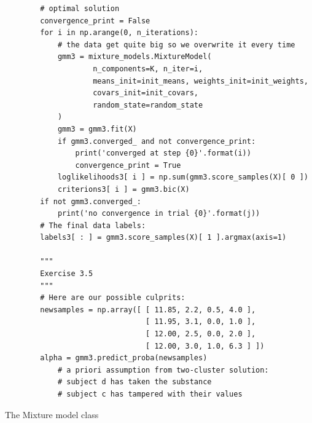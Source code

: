 \begin{verbatim}
        # optimal solution
        convergence_print = False
        for i in np.arange(0, n_iterations):
            # the data get quite big so we overwrite it every time
            gmm3 = mixture_models.MixtureModel(
                    n_components=K, n_iter=i,
                    means_init=init_means, weights_init=init_weights,
                    covars_init=init_covars,
                    random_state=random_state
            )
            gmm3 = gmm3.fit(X)
            if gmm3.converged_ and not convergence_print:
                print('converged at step {0}'.format(i))
                convergence_print = True
            loglikelihoods3[ i ] = np.sum(gmm3.score_samples(X)[ 0 ])
            criterions3[ i ] = gmm3.bic(X)
        if not gmm3.converged_:
            print('no convergence in trial {0}'.format(j))
        # The final data labels:
        labels3[ : ] = gmm3.score_samples(X)[ 1 ].argmax(axis=1)

        """
        Exercise 3.5
        """
        # Here are our possible culprits:
        newsamples = np.array([ [ 11.85, 2.2, 0.5, 4.0 ],
                                [ 11.95, 3.1, 0.0, 1.0 ],
                                [ 12.00, 2.5, 0.0, 2.0 ],
                                [ 12.00, 3.0, 1.0, 6.3 ] ])
        alpha = gmm3.predict_proba(newsamples)
            # a priori assumption from two-cluster solution:
            # subject d has taken the substance
            # subject c has tampered with their values
\end{verbatim}

The Mixture model class

